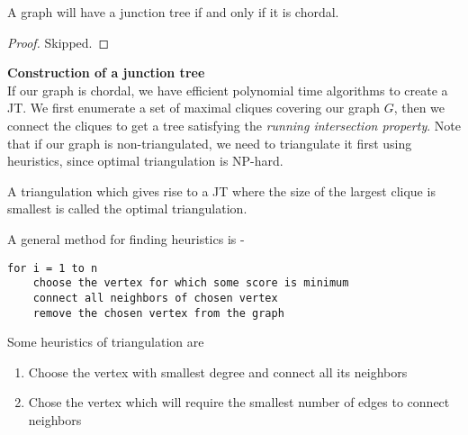 \begin{thm}
A graph will have a junction tree if and only if it is chordal.
\end{thm}
\begin{proof}
Skipped.
\end{proof}
\noindent\textbf{Construction of a junction tree}\\
If our graph is chordal, we have efficient polynomial time algorithms to create a JT. We first enumerate a set of maximal cliques covering our graph $G$, then we connect the cliques to get a tree satisfying the \textit{running intersection property}. Note that if our graph is non-triangulated, we need to triangulate it first using heuristics, since optimal triangulation is NP-hard.
\begin{defn}
A triangulation which gives rise to a JT where the size of the largest clique is smallest is called the optimal triangulation.
\end{defn}
\noindent A general method for finding heuristics is -
\begin{verbatim}
for i = 1 to n
	choose the vertex for which some score is minimum
	connect all neighbors of chosen vertex
	remove the chosen vertex from the graph
\end{verbatim}
Some heuristics of triangulation are
\begin{enumerate}
	\item Choose the vertex with smallest degree and connect all its neighbors
	\item Chose the vertex which will require the smallest number of edges to connect neighbors
\end{enumerate}
